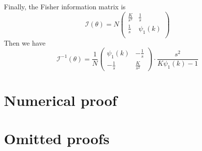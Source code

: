 \documentclass[final]{aomart}
\newtheorem[{}\it]{thm}{Theorem}[section]
\theoremstyle{definition}
\newtheorem*[{}\it]{notation}{Notation}
\numberwithin{equation}{section}
\newcommand{\fisher}{\mathcal{I}} %
\begin{document}
Finally, the Fisher information matrix is 
\[ \fisher(\theta) = N\left( \begin{array}{cc}
	\frac{K}{s^2} & \frac{1}{s} \\
	\frac{1}{s} & \psi_1(k) \\
	 \end{array} \right)\] 
Then we have
\[ \fisher^{-1}(\theta) = \frac{1}{N}\left( \begin{array}{cc}
	\psi_1(k) & -\frac{1}{s}\\
	-\frac{1}{s} & \frac{K}{s^2}
\end{array} \right)\cdot \frac{s^2}{K\psi_1(k) - 1} \] 
\section{Numerical proof}

\appendix
\section{Omitted proofs}
\end{document}
